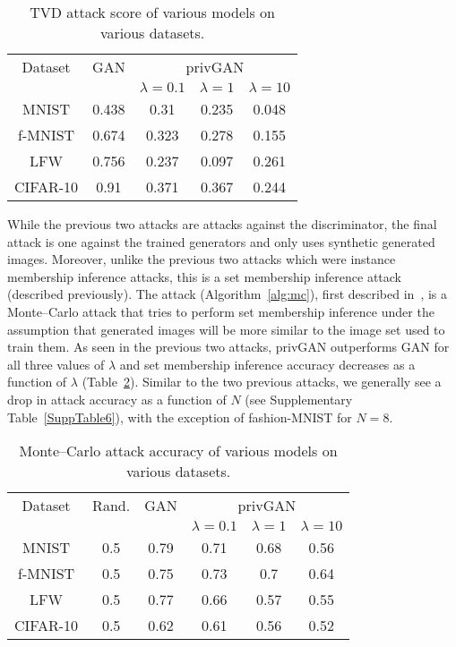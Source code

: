 \documentclass{article}
\begin{document}
\begin{table}[h!]
\small
\begin{center}
\begin{tabular}{c|c|c|c|c} 
 \hline
 \multicolumn{1}{c|}{Dataset}  & \multicolumn{1}{c|}{GAN}&\multicolumn{3}{c}{privGAN}\\
 \cline{3-5}
 \multicolumn{1}{c|}{} & \multicolumn{1}{c|}{} & $\lambda=0.1$ & $\lambda=1$ & $\lambda=10$ 
 \\ \hline
MNIST   & 0.438 & 0.31 & 0.235 & 0.048\\ 
f-MNIST  & 0.674 & 0.323 & 0.278 & 0.155\\
LFW  & 0.756 & 0.237 & 0.097 & 0.261\\ 
CIFAR-10  & 0.91 & 0.371 & 0.367 & 0.244\\
 \hline
\end{tabular}
\end{center}
 \caption{TVD attack score of various models on various datasets.}
 \label{Table2}
\end{table}

While the previous two attacks are attacks against the discriminator, the final attack is one against the trained generators and only uses synthetic generated images. Moreover, unlike the previous two attacks which were instance membership inference attacks, this is a set membership inference attack (described previously). The attack (Algorithm~\ref{alg:mc}), first described in~\cite{hilprecht2019monte}, is a Monte--Carlo attack that tries to perform set membership inference under the assumption that generated images will be more similar to the image set used to train them. As seen in the previous two attacks, privGAN outperforms GAN for all three values of $\lambda$ and set membership inference accuracy decreases as a function of $\lambda$ (Table~\ref{Table3}). Similar to the two previous attacks, we generally see a drop in attack accuracy as a function of $N$ (see Supplementary Table~\ref{SuppTable6}), with the exception of fashion-MNIST for $N=8$. 

\begin{table}[h!]
\small
\begin{center}
\begin{tabular}{c|c|c|c|c|c} 
 \hline
 \multicolumn{1}{c|}{Dataset} & \multicolumn{1}{c|}{Rand.} & \multicolumn{1}{c|}{GAN}&\multicolumn{3}{c}{privGAN}\\
 \cline{4-6}
 \multicolumn{1}{c|}{} & \multicolumn{1}{c|}{}& \multicolumn{1}{c|}{} & $\lambda=0.1$ & $\lambda=1$ & $\lambda=10$ 
 \\ \hline
MNIST  & 0.5 & 0.79 & 0.71 & 0.68 & 0.56\\ 
 f-MNIST  & 0.5 & 0.75 & 0.73 & 0.7 & 0.64\\
 LFW & 0.5 & 0.77 & 0.66 & 0.57 & 0.55\\ 
 CIFAR-10 & 0.5 & 0.62 & 0.61 & 0.56 & 0.52\\
 \hline
\end{tabular}
\end{center}
 \caption{Monte--Carlo attack accuracy of various models on various datasets.}
 \label{Table3}
\end{table}
\end{document}
